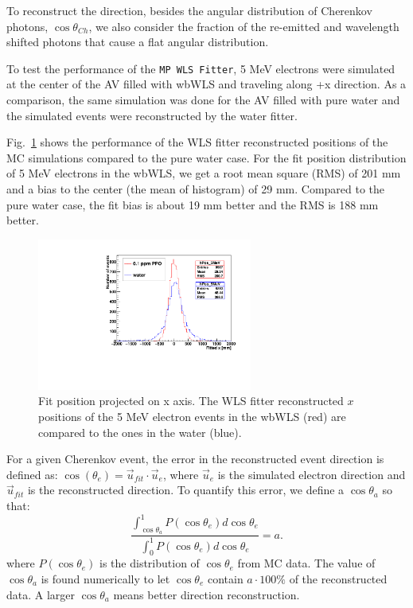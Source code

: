 To reconstruct the direction, besides the angular distribution of Cherenkov photons, $\cos\theta_{Ch}$, we also consider the fraction of the re-emitted and wavelength shifted photons that cause a flat angular distribution.

To test the performance of the \texttt{MP WLS Fitter}, 5 MeV electrons were simulated at the center of the AV filled with wbWLS and traveling along +x direction. As a comparison, the same simulation was done for the AV filled with pure water and the simulated events were reconstructed by the water fitter.

Fig.~\ref{WLSFitPos} shows the performance of the WLS fitter reconstructed positions of the MC simulations compared to the pure water case. For the fit position distribution of 5 MeV electrons in the wbWLS, we get a root mean square (RMS) of 201 mm and a bias to the center (the mean of histogram) of 29 mm. Compared to the pure water case, the fit bias is about 19 mm better and the RMS is 188 mm better.

\begin{figure}[htbp]	
	\centering			
	\includegraphics[height=5cm]{WLS_FittedPos.pdf}		
	\caption{\label{WLSFitPos} Fit position projected on x axis. The WLS fitter reconstructed $x$ positions of the 5 MeV electron events in the wbWLS (red) are compared to the ones in the water (blue).
	}
\end{figure}

For a given Cherenkov event, the error in the reconstructed event direction is defined as\cite{boulay2004direct}: $\cos(\theta_e)=\vec{u}_{fit}\cdot\vec{u}_e$, where $\vec{u}_e$ is the simulated electron direction and $\vec{u}_{fit}$ is the reconstructed direction. To quantify this error, we define a $\cos\theta_{a}$ so that:
\[
\frac{\int_{\cos\theta_{a}}^1 P(\cos\theta_e) d\cos\theta_e}{\int_0^1 P(\cos\theta_e) d\cos\theta_e} = a.
\] 
where $P(\cos\theta_e)$ is the distribution of $\cos\theta_e$ from MC data. The value of $\cos\theta_{a}$ is found numerically to let $\cos\theta_e$ contain $ a\cdot 100\%$ of the reconstructed data. A larger $\cos\theta_{a}$ means better direction reconstruction.

